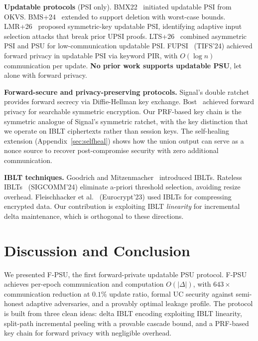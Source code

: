 \documentclass[letterpaper,twocolumn,10pt]{article}
\theoremstyle{definition}
\begin{document}
\textbf{Updatable protocols} (PSI only). BMX22~\cite{BMX22} initiated updatable
PSI from OKVS. BMS+24~\cite{BMS+24} extended to support deletion with
worst-case bounds. LMR+26~\cite{LMR+26} proposed symmetric-key updatable PSI,
identifying adaptive input selection attacks that break prior UPSI proofs.
LTS+26~\cite{LTS+26} combined asymmetric PSI and PSU for low-communication
updatable PSI. FUPSI~\cite{WZC+24} (TIFS'24) achieved forward privacy in
updatable PSI via keyword PIR, with $O(\log n)$ communication per update.
\textbf{No prior work supports updatable PSU}, let alone with forward privacy.

\textbf{Forward-secure and privacy-preserving protocols.} Signal's double
ratchet~\cite{Signal} provides forward secrecy via Diffie-Hellman key exchange.
Bost~\cite{Bos16} achieved forward privacy for searchable symmetric encryption.
Our PRF-based key chain is the symmetric analogue of Signal's symmetric ratchet,
with the key distinction that we operate on IBLT ciphertexts rather than session
keys. The self-healing extension (Appendix~\ref{sec:selfheal}) shows how the
union output can serve as a nonce source to recover post-compromise security
with zero additional communication.

\textbf{IBLT techniques.} Goodrich and Mitzenmacher~\cite{GM11} introduced
IBLTs. Rateless IBLTs~\cite{YGA24} (SIGCOMM'24) eliminate a-priori threshold
selection, avoiding resize overhead. Fleischhacker et al.~\cite{FLS23}
(Eurocrypt'23) used IBLTs for compressing encrypted data. Our contribution is
exploiting IBLT \emph{linearity} for incremental delta maintenance, which is
orthogonal to these directions.

\section{Discussion and Conclusion}

We presented F-PSU, the first forward-private updatable PSU protocol. F-PSU
achieves per-epoch communication and computation $O(|\Delta|)$, with
$643\times$ communication reduction at $0.1\%$ update ratio, formal UC
security against semi-honest adaptive adversaries, and a provably optimal
leakage profile. The protocol is built from three clean ideas: delta IBLT
encoding exploiting IBLT linearity, split-path incremental peeling with a
provable cascade bound, and a PRF-based key chain for forward privacy with
negligible overhead.
\end{document}
